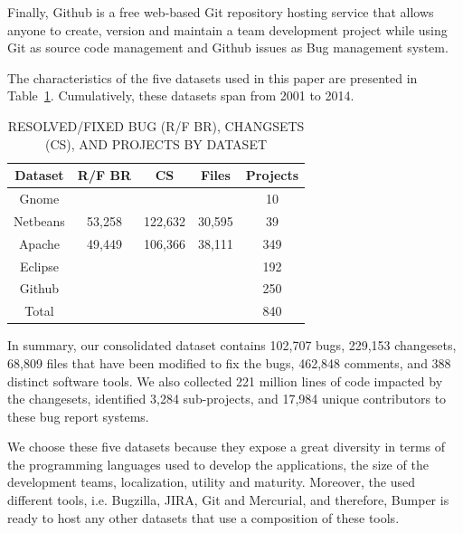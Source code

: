 \documentclass[conference]{IEEEtran}
\begin{document}
Finally, Github is a free web-based Git repository hosting service that allows anyone to create, version and maintain a team development project while using Git as source code management and Github issues as Bug management system.

The characteristics of the five datasets used in this paper are presented in Table~\ref{tab:summary}.
Cumulatively, these datasets span from 2001 to 2014.

\begin{table}[]
\centering
\caption{
RESOLVED/FIXED BUG (R/F BR),  CHANGSETS (CS), AND
PROJECTS BY DATASET}
\label{tab:summary}
\begin{tabular}{c|c|c|c|c}
\textbf{Dataset} & \textbf{R/F BR} & \textbf{CS} & \textbf{Files} & \textbf{Projects} \\ \hline \hline
Gnome            &                 &             &                & 10                \\ \hline
Netbeans         & 53,258          & 122,632     & 30,595         & 39                \\ \hline
Apache           & 49,449          & 106,366     & 38,111         & 349               \\ \hline
Eclipse          &                 &             &                & 192               \\ \hline
Github           &                 &             &                & 250               \\ \hline
Total            &                 &             &                & 840               \\ \hline \hline
\end{tabular}
\end{table}

In summary, our consolidated dataset contains 102,707 bugs, 229,153 changesets, 68,809 files that have been modified to fix the bugs, 462,848 comments, and 388 distinct software tools.
We also collected 221 million lines of code impacted by the changesets, identified 3,284 sub-projects, and 17,984 unique contributors to these bug report systems.

We choose these five datasets because they expose a great diversity in terms of the programming languages used to develop the applications, the size of the development teams, localization, utility and maturity.
Moreover, the used different tools, i.e.
Bugzilla, JIRA, Git and Mercurial, and therefore, Bumper is ready to host any other datasets that use a composition of these tools.
\end{document}
